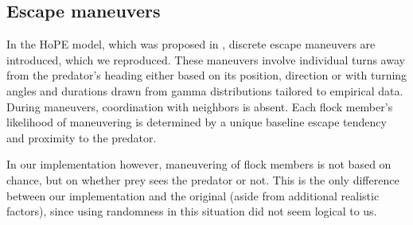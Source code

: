 \documentclass[9pt]{pnas-new}
\begin{document}
\subsection*{Escape maneuvers}

In the HoPE model, which was proposed in \cite{papadopoulou2022emergence}, discrete escape maneuvers are introduced, which we reproduced.
These maneuvers involve individual turns away from the predator's heading either based on its position, direction or with turning angles and durations drawn from gamma distributions tailored to empirical data.
During maneuvers, coordination with neighbors is absent.
Each flock member's likelihood of maneuvering is determined by a unique baseline escape tendency and proximity to the predator.

In our implementation however, maneuvering of flock members is not based on chance, but on whether prey sees the predator or not.
This is the only difference between our implementation and the original (aside from additional realistic factors), since using randomness in this situation did not seem logical to us.
\end{document}
